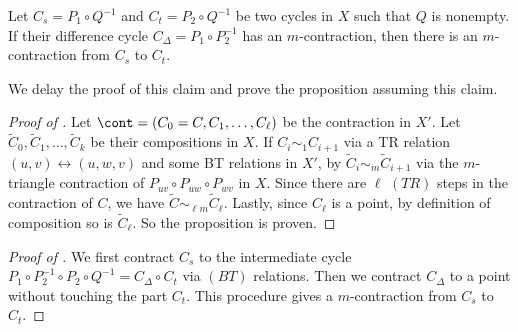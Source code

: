 \begin{claim} \label{claim:shift-between-paths}
    Let \(C_s = P_1 \circ Q^{-1}\) and \( C_t = P_2 \circ Q^{-1}\) be two cycles in $X$ such that $Q$ is nonempty. If their difference cycle $C_\Delta = P_1 \circ P_2^{-1}$ has an \(m\)-contraction, then there is an \(m\)-contraction from \(C_s\) to \(C_t \).
\end{claim}

We delay the proof of this claim and prove the proposition assuming this claim.

\begin{proof}[Proof of ]
    Let \(\cont = (C_0 = C, C_1,\dots,C_\ell)\) be the contraction in $X'$. Let \(\tilde{C}_0,\tilde{C}_1,\dots,\tilde{C}_k\) be their compositions in $X$. If \(C_i \sim_1 C_{i+1}\) via a TR relation \((u,v) \leftrightarrow (u,w,v)\) and some BT relations in $X'$, by  \(\tilde{C}_i \sim_m \tilde{C}_{i+1}\) via the $m$-triangle contraction of \(P_{uv} \circ P_{uw} \circ P_{wv}\) in $X$. 
    Since there are $\ell$ \((TR)\) steps in the contraction of $C$, we have $\tilde{C} \sim_{\ell m} \tilde{C}_\ell$. Lastly, since \(C_\ell\) is a point, by definition of composition so is \(\tilde{C}_\ell\). So the proposition is proven.
\end{proof}


\begin{proof}[Proof of ]
    We first contract \(C_s\) to the intermediate cycle \(P_1 \circ P_2^{-1} \circ P_2 \circ Q^{-1} = C_\Delta \circ C_t\) via \((BT)\) relations. Then we contract \(C_\Delta \) to a point without touching the part \(C_t\). This procedure gives a $m$-contraction from $C_s$ to $C_t$.
\end{proof}



